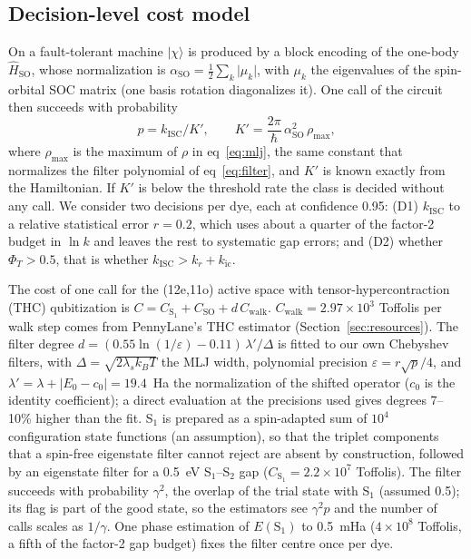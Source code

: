 \documentclass[journal=jctcce,manuscript=article,layout=twocolumn]{achemso}
\newcommand{\kisc}{k_\mathrm{ISC}}
\newcommand{\Hso}{\hat H_\mathrm{SO}}
\newcommand{\aso}{\alpha_\mathrm{SO}}
\begin{document}
\subsection{Decision-level cost model}
\label{sec:decision-method}

On a fault-tolerant machine $\lvert\chi\rangle$ is produced by a block encoding of the one-body
$\Hso$, whose normalization is $\aso=\tfrac12\sum_k\lvert\mu_k\rvert$, with $\mu_k$ the eigenvalues of
the spin-orbital SOC matrix (one basis rotation diagonalizes it). One call of the circuit then succeeds
with probability
\begin{equation}
  p = \kisc/K',\qquad K' = \frac{2\pi}{\hbar}\,\aso^2\,\rho_\mathrm{max},
  \label{eq:p}
\end{equation}
where $\rho_\mathrm{max}$ is the maximum of $\rho$ in eq~\ref{eq:mlj}, the same constant that normalizes
the filter polynomial of eq~\ref{eq:filter}, and $K'$ is known exactly from the Hamiltonian. If $K'$ is below the threshold rate the class is decided
without any call. We consider two decisions per dye, each at confidence 0.95: (D1) $\kisc$ to a relative
statistical error $r=0.2$, which uses about a quarter of the factor-2 budget in $\ln k$ and leaves the
rest to systematic gap errors; and (D2) whether $\Phi_T>0.5$, that is whether $\kisc>k_r+k_\mathrm{ic}$.

The cost of one call for the (12e,11o) active space with tensor-hypercontraction (THC)
qubitization is $C = C_{\mathrm{S}_1} + C_\mathrm{SO} + d\,C_\mathrm{walk}$. $C_\mathrm{walk}=2.97\times10^{3}$
Toffolis per walk step comes from PennyLane's THC estimator (Section~\ref{sec:resources}). The filter
degree $d=(0.55\ln(1/\varepsilon)-0.11)\,\lambda'/\Delta$ is fitted to our own Chebyshev filters, with
$\Delta=\sqrt{2\lambda_sk_BT}$ the MLJ width, polynomial precision $\varepsilon=r\sqrt p/4$, and
$\lambda'=\lambda+\lvert E_0-c_0\rvert=19.4$~Ha the normalization of the shifted operator ($c_0$ is the
identity coefficient); a direct evaluation at the precisions used gives degrees 7--10\% higher than the fit.
S$_1$ is prepared as a spin-adapted sum of $10^{4}$ configuration state functions (an assumption), so that
the triplet components that a spin-free eigenstate filter cannot reject are absent by construction, followed
by an eigenstate filter for a 0.5~eV S$_1$--S$_2$ gap ($C_{\mathrm{S}_1}=2.2\times10^{7}$ Toffolis). The filter
succeeds with probability $\gamma^2$, the overlap of the trial state with S$_1$ (assumed 0.5); its flag is
part of the good state, so the estimators see $\gamma^2p$ and the number of calls scales as $1/\gamma$. One
phase estimation of $E(\mathrm{S}_1)$ to 0.5~mHa ($4\times10^{8}$ Toffolis, a fifth of the factor-2 gap
budget) fixes the filter centre once per dye.
\end{document}
